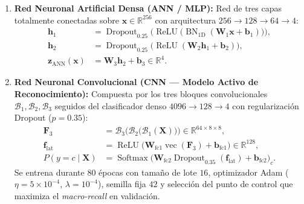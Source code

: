 \documentclass{article}
\begin{document}
\begin{enumerate}
    \item \textbf{Red Neuronal Artificial Densa (ANN / MLP):} Red de tres capas totalmente conectadas sobre $\mathbf{x} \in \mathbb{R}^{256}$ con arquitectura $256 \to 128 \to 64 \to 4$:
    \begin{align}
    \mathbf{h}_1 &= \operatorname{Dropout}_{0.25}\!\Big(\operatorname{ReLU}\!\big(\operatorname{BN}_{1\text{D}}(\mathbf{W}_1 \mathbf{x} + \mathbf{b}_1)\big)\Big), \\
    \mathbf{h}_2 &= \operatorname{Dropout}_{0.25}\!\Big(\operatorname{ReLU}(\mathbf{W}_2 \mathbf{h}_1 + \mathbf{b}_2)\Big), \\
    \mathbf{z}_{\text{ANN}}(\mathbf{x}) &= \mathbf{W}_3 \mathbf{h}_2 + \mathbf{b}_3 \in \mathbb{R}^4.
    \label{eq:arquitectura_ann}
    \end{align}

    \item \textbf{Red Neuronal Convolucional (CNN --- Modelo Activo de Reconocimiento):} Compuesta por los tres bloques convolucionales $\mathcal{B}_1, \mathcal{B}_2, \mathcal{B}_3$ seguidos del clasificador denso $4096 \to 128 \to 4$ con regularización Dropout ($p = 0.35$):
    \begin{align}
    \mathbf{F}_3 &= \mathcal{B}_3\bigl(\mathcal{B}_2\bigl(\mathcal{B}_1(\mathbf{X})\bigr)\bigr) \in \mathbb{R}^{64 \times 8 \times 8}, \\
    \mathbf{f}_{\text{lat}} &= \operatorname{ReLU}\!\big(\mathbf{W}_{\text{fc1}} \operatorname{vec}(\mathbf{F}_3) + \mathbf{b}_{\text{fc1}}\big) \in \mathbb{R}^{128}, \\
    P(y = c \mid \mathbf{X}) &= \operatorname{Softmax}\!\big(\mathbf{W}_{\text{fc2}} \operatorname{Dropout}_{0.35}(\mathbf{f}_{\text{lat}}) + \mathbf{b}_{\text{fc2}}\big)_c.
    \label{eq:arquitectura_cnn}
    \end{align}
    Se entrena durante $80$ épocas con tamaño de lote $16$, optimizador Adam ($\eta = 5 \times 10^{-4}$, $\lambda = 10^{-4}$), semilla fija $42$ y selección del punto de control que maximiza el \textit{macro-recall} en validación.
\end{enumerate}
\end{document}
